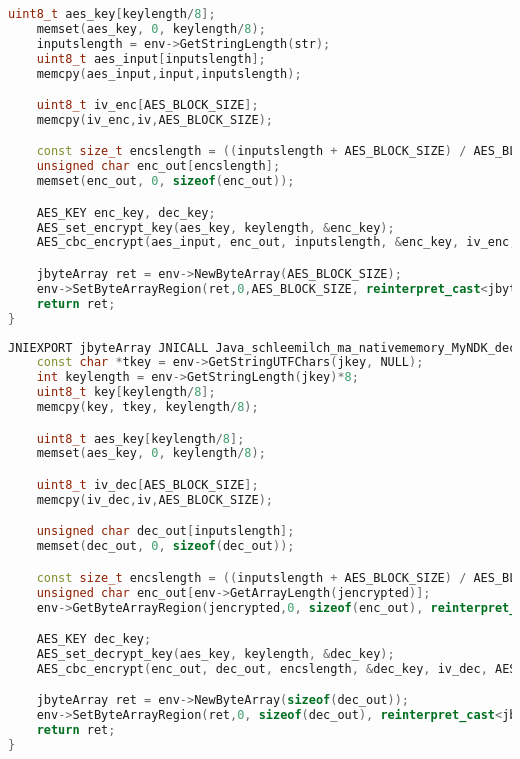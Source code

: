 \begin{appendices}
\begin{lstlisting}[language=C++, caption=AES Encrypt(), label=nkd_aes_encrypt]
    uint8_t aes_key[keylength/8];
    memset(aes_key, 0, keylength/8);
    inputslength = env->GetStringLength(str);
    uint8_t aes_input[inputslength];
    memcpy(aes_input,input,inputslength);

    uint8_t iv_enc[AES_BLOCK_SIZE];
    memcpy(iv_enc,iv,AES_BLOCK_SIZE);

    const size_t encslength = ((inputslength + AES_BLOCK_SIZE) / AES_BLOCK_SIZE) * AES_BLOCK_SIZE;
    unsigned char enc_out[encslength];
    memset(enc_out, 0, sizeof(enc_out));

    AES_KEY enc_key, dec_key;
    AES_set_encrypt_key(aes_key, keylength, &enc_key);
    AES_cbc_encrypt(aes_input, enc_out, inputslength, &enc_key, iv_enc, AES_ENCRYPT);

    jbyteArray ret = env->NewByteArray(AES_BLOCK_SIZE);
    env->SetByteArrayRegion(ret,0,AES_BLOCK_SIZE, reinterpret_cast<jbyte *>(enc_out));
    return ret;
}
\end{lstlisting}
\newpage
\begin{lstlisting}[language=C++, caption=AES Decrypt(), label=nkd_aes_decrypt]
JNIEXPORT jbyteArray JNICALL Java_schleemilch_ma_nativememory_MyNDK_decrypt (JNIEnv *env, jobject obj, jbyteArray jencrypted, jstring jkey){
    const char *tkey = env->GetStringUTFChars(jkey, NULL);
    int keylength = env->GetStringLength(jkey)*8;
    uint8_t key[keylength/8];
    memcpy(key, tkey, keylength/8);

    uint8_t aes_key[keylength/8];
    memset(aes_key, 0, keylength/8);

    uint8_t iv_dec[AES_BLOCK_SIZE];
    memcpy(iv_dec,iv,AES_BLOCK_SIZE);

    unsigned char dec_out[inputslength];
    memset(dec_out, 0, sizeof(dec_out));

    const size_t encslength = ((inputslength + AES_BLOCK_SIZE) / AES_BLOCK_SIZE) * AES_BLOCK_SIZE;
    unsigned char enc_out[env->GetArrayLength(jencrypted)];
    env->GetByteArrayRegion(jencrypted,0, sizeof(enc_out), reinterpret_cast<jbyte*>(enc_out));

    AES_KEY dec_key;
    AES_set_decrypt_key(aes_key, keylength, &dec_key);
    AES_cbc_encrypt(enc_out, dec_out, encslength, &dec_key, iv_dec, AES_DECRYPT);

    jbyteArray ret = env->NewByteArray(sizeof(dec_out));
    env->SetByteArrayRegion(ret,0, sizeof(dec_out), reinterpret_cast<jbyte *>(dec_out));
    return ret;
}
\end{lstlisting}


\end{appendices}
